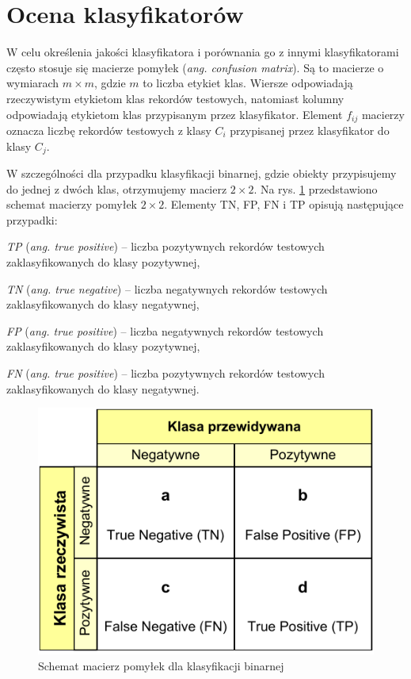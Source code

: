 \section{Ocena klasyfikatorów}
W celu określenia jakości klasyfikatora i porównania go z innymi klasyfikatorami często stosuje się macierze pomyłek (\emph{ang. confusion matrix}). Są to macierze o wymiarach $m \times m$, gdzie $m$ to liczba etykiet klas. Wiersze odpowiadają rzeczywistym etykietom klas rekordów testowych, natomiast kolumny odpowiadają etykietom klas przypisanym przez klasyfikator. Element $f_{ij}$ macierzy oznacza liczbę rekordów testowych z klasy $C_i$ przypisanej przez klasyfikator do klasy $C_j$.

W szczególności dla przypadku klasyfikacji binarnej, gdzie obiekty przypisujemy do jednej z dwóch klas, otrzymujemy macierz $2\times 2$. Na rys. \ref{fig:confusion-matrix} przedstawiono schemat macierzy pomyłek $2 \times 2$. Elementy TN, FP, FN i TP opisują następujące przypadki:

\begin{compactitem}
	\item \emph{TP} (\emph{ang. true positive}) -- liczba pozytywnych rekordów testowych zaklasyfikowanych do klasy pozytywnej,
	\item \emph{TN} (\emph{ang. true negative}) -- liczba negatywnych rekordów testowych zaklasyfikowanych do klasy negatywnej,
	\item \emph{FP} (\emph{ang. true positive}) -- liczba negatywnych rekordów testowych zaklasyfikowanych do klasy pozytywnej,
	\item \emph{FN} (\emph{ang. true positive}) -- liczba pozytywnych rekordów testowych zaklasyfikowanych do klasy negatywnej.
\end{compactitem}

\begin{figure}[h]
	\centering
	\includegraphics[scale=1.0]{graphics/01_podstawy_teoretyczne/confusion-matrix.pdf}
	\caption{ Schemat macierz pomyłek dla klasyfikacji binarnej \cite{KOHAVI98} }
	\label{fig:confusion-matrix}
\end{figure}


